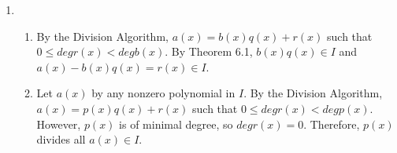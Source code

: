 \documentclass{article}
\begin{document}
\begin{enumerate}
\item
\begin{enumerate}
\item
By the Division Algorithm, $a(x) = b(x)q(x) + r(x)$ such that
$0 \leq deg r(x) < deg b(x)$.  By Theorem 6.1, $b(x)q(x) \in I$ and
$a(x) - b(x)q(x) = r(x) \in I$.

\item Let $a(x)$ by any nonzero polynomial in $I$.  By the Division Algorithm,
$a(x) = p(x)q(x) + r(x)$ such that $0 \leq deg r(x) < deg p(x)$.  However,
$p(x)$ is of minimal degree, so $deg r(x) = 0$.  Therefore, $p(x)$ divides
all $a(x) \in I$.

\end{enumerate}

\end{enumerate}
\end{document}
